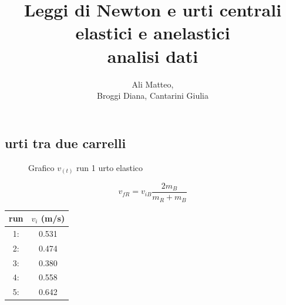\documentclass[a4paper]{article}
\title{Leggi di Newton e urti centrali elastici e anelastici\\ analisi dati}
\author{Ali Matteo,\\Broggi Diana, Cantarini Giulia}
\date{ }
\theoremstyle{definition}
\begin{document}
	\maketitle
\subsection*{urti tra due carrelli}

\begin{figure}[!ht]
		\captionsetup{labelformat=empty}
	\caption{Grafico \(v_{(t)}\) run 1 urto elastico}
	
\end{figure}
\[v_{f R} = v_{i B} \frac{2 m_{B}}{m_{R}+m_{B}}\]
\begin{minipage}[c]{0.5\textwidth}
		\captionsetup{labelformat=empty}
	\centering
	\begin{tabular}{||cc||}
		\hline
		\hline
		run &  \(v_{i}\) (m/s)\\
		\hline
		1: & 0.531  \\ 
		2: & 0.474\\
		3: & 0.380\\
		4: & 0.558\\
		5: & 0.642\\
		\hline
		\hline
	\end{tabular}

\end{minipage}
\end{document}
